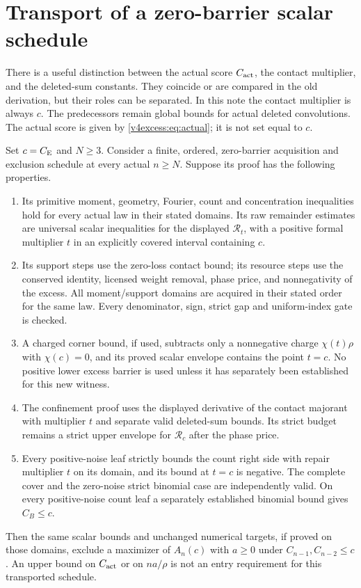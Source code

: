 \section{Transport of a zero-barrier scalar schedule}
There is a useful distinction between the actual score $C_{\rm act}$,
the contact multiplier, and the deleted-sum constants. They coincide or
are compared in the old derivation, but their roles can be separated.
In this note the contact multiplier is always $c$. The predecessors
remain global bounds for actual deleted convolutions. The actual score
is given by \eqref{v4excess:eq:actual}; it is not set equal to $c$.

\begin{theorem}\label{v4excess:thm:transport}
Set $c=C_{\mathrm E}$ and $N\ge3$. Consider a finite, ordered, zero-barrier acquisition
and exclusion schedule at every actual $n\ge N$. Suppose its proof has the following
properties.
\begin{enumerate}
\item Its primitive moment, geometry, Fourier, count and concentration
inequalities hold for every actual law in their stated domains. Its raw
remainder estimates are universal scalar inequalities for the displayed
$\mathcal R_t$, with a positive formal multiplier $t$ in an explicitly
covered interval containing $c$.
\item Its support steps use the zero-loss contact bound; its resource
steps use the conserved identity, licensed weight removal, phase price,
and nonnegativity of the excess. All moment/support domains are acquired
in their stated order for the same law. Every denominator, sign, strict
gap and uniform-index gate is checked.
\item A charged corner bound, if used, subtracts only a nonnegative
charge $\chi(t)\rho$ with $\chi(c)=0$, and its proved scalar envelope
contains the point $t=c$. No positive lower excess barrier is used unless
it has separately been established for this new witness.
\item The confinement proof uses the displayed derivative of the contact
majorant with multiplier $t$ and separate valid deleted-sum bounds. Its
strict budget remains a strict upper envelope for $\mathcal R_c$ after
the phase price.
\item Every positive-noise leaf strictly bounds the count right side
with repair multiplier $t$ on its domain, and its bound at $t=c$ is
negative. The complete cover and the zero-noise strict binomial case
are independently valid. On every positive-noise count leaf a separately
established binomial bound gives $C_B\le c$.
\end{enumerate}
Then the same scalar bounds and unchanged numerical targets, if proved
on those domains, exclude a maximizer of $A_n(c)$ with $a\ge0$ under
$C_{n-1},C_{n-2}\le c$. An upper bound on $C_{\rm act}$ or on $na/\rho$
is not an entry requirement for this transported schedule.
\end{theorem}
